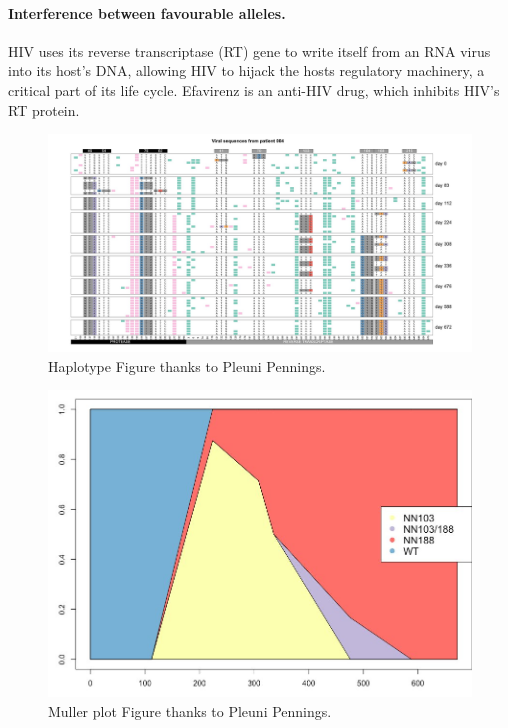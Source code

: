 \paragraph{Interference between favourable alleles.}

HIV uses its reverse transcriptase (RT) gene to write itself from an RNA virus into its host's DNA, allowing HIV to hijack the hosts regulatory machinery, a critical part of its life cycle. 
Efavirenz is an anti-HIV drug, which inhibits HIV's RT protein. 

\begin{figure}
\begin{center}
  \includegraphics[width =  \textwidth]{Journal_figs/recom_selection/Pleuni_HIV_interference/DdwdkVeVMAA7t-V.jpg}
\end{center}
\caption{Haplotype Figure thanks to Pleuni Pennings.} \label{fig:HIV_interference}  %
\end{figure}

\begin{figure}
\begin{center}
  \includegraphics[width = 0.8 \textwidth]{Journal_figs/recom_selection/Pleuni_HIV_interference/DdweQyxU0AA7mXe.jpg}
\end{center}
\caption{Muller plot Figure thanks to Pleuni Pennings.} \label{fig:HIV_interference_M}  %
\end{figure}



